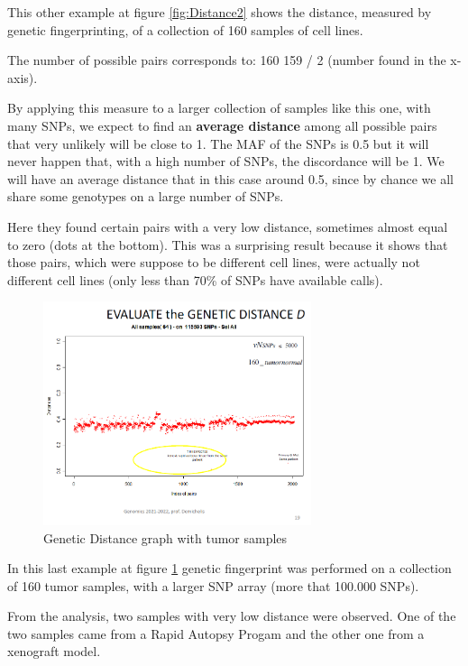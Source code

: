 \bigskip
This other example at figure \ref{fig:Distance2} shows the distance, measured by
genetic fingerprinting, of a collection of 160 samples of cell lines. 

The number of possible pairs corresponds to: 160  159 / 2 (number found in the
x-axis). 

By applying this measure to a larger collection of samples like this one, with
many SNPs, we expect to find an \textbf{average distance} among all possible
pairs that very unlikely will be close to 1. The MAF of the SNPs is 0.5 but it
will never happen that, with a high number of SNPs, the discordance will be 1.
We will have an average distance that in this case around 0.5, since by chance
we all share some genotypes on a large number of SNPs. 

Here they found certain pairs with a very low distance, sometimes almost equal
to zero (dots at the bottom). This was a surprising result because it shows that
those pairs, which were suppose to be different cell lines, were actually not
different cell lines (only less than 70\% of SNPs have available calls). 

\begin{figure}
	\centering
	\includegraphics[width=0.7\textwidth]{Distance3.PNG}
	\caption{\label{fig:Distance3}Genetic Distance graph with tumor samples}
\end{figure}

\bigskip
In this last example at figure \ref{fig:Distance3} genetic fingerprint was
performed on a collection of 160  tumor samples, with a larger SNP array (more
that 100.000 SNPs).  

From the analysis, two samples with very low distance were observed. One of the
two samples came from a Rapid Autopsy Progam and the other one from a xenograft
model. 

